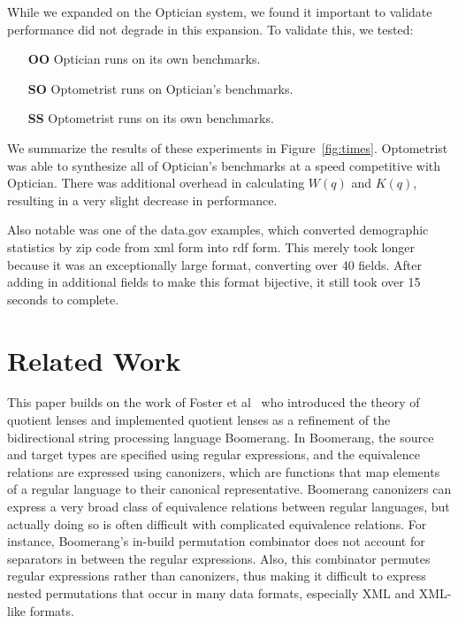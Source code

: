 \documentclass[acmsmall,review,anonymous]{acmart}
\newcommand{\FINISH}[3]{\ifdraft\textcolor{#1}{[#2: #3]}\fi}
\newcommand{\sam}[1]{\FINISH{dkpurple}{SM}{#1}}
\newcommand{\Name}{Optometrist}
\newcommand{\OpticianRuntime}{\textbf{OO}}
\newcommand{\SystemOnOptician}{\textbf{SO}}
\newcommand{\SystemOnBenchmarks}{\textbf{SS}}
\begin{document}
While we expanded on the Optician system, we found it important to validate
performance did not degrade in this expansion.  To validate this, we tested:
\begin{itemize}
  \item[\OpticianRuntime{}] Optician runs on its own benchmarks.
  \item[\SystemOnOptician{}] \Name{} runs on Optician's benchmarks.
  \item[\SystemOnBenchmarks{}] \Name{} runs on its own benchmarks.
\end{itemize}

We summarize the results of these experiments in Figure~\ref{fig:times}.
\Name{} was
able to synthesize all of Optician's benchmarks at a speed competitive with
Optician.  There was additional overhead in calculating $W(q)$ and $K(q)$,
resulting in a very slight decrease in performance.

Also notable was one of the data.gov examples, which converted demographic
statistics by zip code from xml form into rdf form.  This merely took longer because it was
an exceptionally large format, converting over 40 fields.  After adding in additional
fields to make this format bijective, it still took over 15 seconds to complete.

\section{Related Work}
\label{relwork}

This paper builds on the work of Foster et al~\cite{quotientlenses} who
introduced the theory of quotient lenses and implemented quotient lenses as a
refinement of the bidirectional string processing language Boomerang.
In Boomerang, the source and target types are specified using regular
expressions, and the equivalence relations are expressed using canonizers, which
are functions that map elements of a regular language to their canonical
representative. Boomerang canonizers can express a very broad class of
equivalence relations between regular languages, but actually doing so is often
difficult with complicated equivalence relations. For instance, Boomerang's
in-build permutation combinator does not account for separators in between the
regular expressions. Also, this combinator permutes regular expressions rather
than canonizers, thus making it difficult to express nested permutations that
occur in many data formats, especially XML and XML-like formats.
\end{document}
